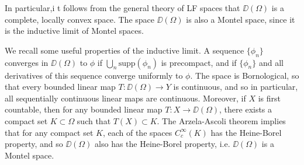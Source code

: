 %
%
%
%
In particular,i t follows from the general theory of LF spaces that $\DD(\Omega)$ is a complete, locally convex space. The space $\DD(\Omega)$ is also a Montel space, since it is the inductive limit of Montel spaces.

We recall some useful properties of the inductive limit. A sequence $\{ \phi_n \}$ converges in $\DD(\Omega)$ to $\phi$ if $\bigcup_n \text{supp}(\phi_n)$ is precompact, and if $\{ \phi_n \}$ and all derivatives of this sequence converge uniformly to $\phi$. The space is Bornological, so that every bounded linear map $T: \DD(\Omega) \to Y$ is continuous, and so in particular, all sequentially continuous linear maps are continuous. Moreover, if $X$ is first countable, then for any bounded linear map $T: X \to \DD(\Omega)$, there exists a compact set $K \subset \Omega$ such that $T(X) \subset K$. The Arzela-Ascoli theorem implies that for any compact set $K$, each of the spaces $C_c^\infty(K)$ has the Heine-Borel property, and so $\DD(\Omega)$ also has the Heine-Borel property, i.e. $\DD(\Omega)$ is a Montel space.


